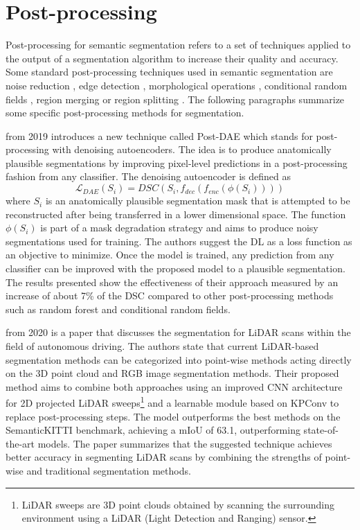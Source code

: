 \section{Post-processing}
Post-processing for semantic segmentation refers to a set of techniques applied to the output of a segmentation algorithm to increase their quality and accuracy. Some standard post-processing techniques used in semantic segmentation are noise reduction \cite{van2003noise}, edge detection \cite{shrivakshan2012comparison}, morphological operations \cite{chudasama2015image}, conditional random fields \cite{8991232}, region merging or region splitting \cite{patil2013medical}. The following paragraphs summarize some specific post-processing methods for segmentation.

 \cite{https://doi.org/10.48550/arxiv.1906.02343} from 2019 introduces a new technique called Post-DAE which stands for post-processing with denoising autoencoders. The idea is to produce anatomically plausible segmentations by improving pixel-level predictions in a post-processing fashion from any classifier. 
    The denoising autoencoder is defined as
\begin{equation}
    \mathcal{L}_{DAE}(S_i)=DSC(S_i,f_{dec}(f_{enc}(\phi(S_i))))
\end{equation}
where $S_i$ is an anatomically plausible segmentation mask that is attempted to be reconstructed after being transferred in a lower dimensional space. The function $\phi(S_i)$ is part of a mask degradation strategy and aims to produce noisy segmentations used for training. The authors suggest the \ac{DL} as a loss function as an objective to minimize. Once the model is trained, any prediction from any classifier can be improved with the proposed model to a plausible segmentation. The results presented show the effectiveness of their approach measured by an increase of about 7\% of the \ac{DSC} compared to other post-processing methods such as random forest and conditional random fields.

 \cite{https://doi.org/10.48550/arxiv.2007.12668} from 2020 is a paper that discusses the segmentation for LiDAR scans within the field of autonomous driving. The authors state that current LiDAR-based segmentation methods can be categorized into point-wise methods acting directly on the 3D point cloud and RGB image segmentation methods. Their proposed method aims to combine both approaches using an improved \ac{CNN} architecture for 2D projected LiDAR sweeps\footnote{LiDAR sweeps are 3D point clouds obtained by scanning the surrounding environment using a LiDAR (Light Detection and Ranging) sensor. } and a learnable module based on KPConv to replace post-processing steps. The model outperforms the best methods on the SemanticKITTI benchmark, achieving a mIoU of 63.1, outperforming state-of-the-art models. The paper summarizes that the suggested technique achieves better accuracy in segmenting LiDAR scans by combining the strengths of point-wise and traditional segmentation methods.

